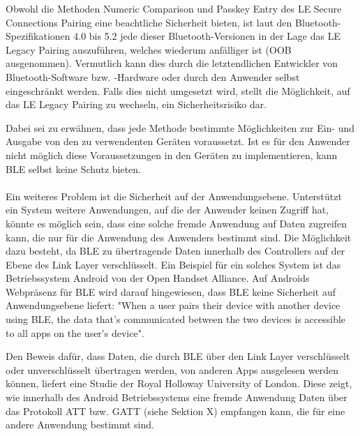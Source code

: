 Obwohl die Methoden Numeric Comparison und Passkey Entry des LE Secure Connections Pairing eine beachtliche Sicherheit bieten, ist laut den Bluetooth-Spezifikationen 4.0 bis 5.2 jede dieser Bluetooth-Versionen in der Lage das LE Legacy Pairing auszuführen, welches wiederum anfälliger ist (OOB ausgenommen). 
Vermutlich kann dies durch die letztendlichen Entwickler von Bluetooth-Software bzw. -Hardware oder durch den Anwender selbst eingeschränkt werden. Falls dies nicht umgesetzt wird, stellt die Möglichkeit, auf das LE Legacy Pairing zu wechseln, ein Sicherheitsrisiko dar.

Dabei sei zu erwähnen, dass jede Methode bestimmte Möglichkeiten zur Ein- und Ausgabe von den zu verwendenten Geräten voraussetzt. Ist es für den Anwender nicht möglich diese Voraussetzungen in den Geräten zu implementieren, kann BLE selbst keine Schutz bieten.\\\\

Ein weiteres Problem ist die Sicherheit auf der Anwendungsebene. Unterstützt ein System weitere Anwendungen, auf die der Anwender keinen Zugriff hat, könnte es möglich sein, dass eine solche fremde Anwendung auf Daten zugreifen kann, die nur für die Anwendung des Anwenders bestimmt sind. Die Möglichkeit dazu besteht, da BLE zu übertragende Daten innerhalb des Controllers auf der Ebene des Link Layer verschlüsselt. 
Ein Beispiel für ein solches System ist das Betriebssystem Android von der Open Handset Alliance. Auf Androids Webpräsenz für BLE wird darauf hingewiesen, dass BLE keine Sicherheit auf Anwendungsebene liefert: "When a user pairs their device with another device using BLE, the data that's communicated between the two devices is accessible to all apps on the user's device".

Den Beweis dafür, dass Daten, die durch BLE über den Link Layer verschlüsselt oder unverschlüsselt übertragen werden, von anderen Apps ausgelesen werden können, liefert eine Studie der Royal Holloway University of London. Diese zeigt, wie innerhalb des Android Betriebssystems eine fremde Anwendung Daten über das Protokoll ATT bzw. GATT (siehe Sektion X) 
empfangen kann, die für eine andere Anwendung bestimmt sind.


